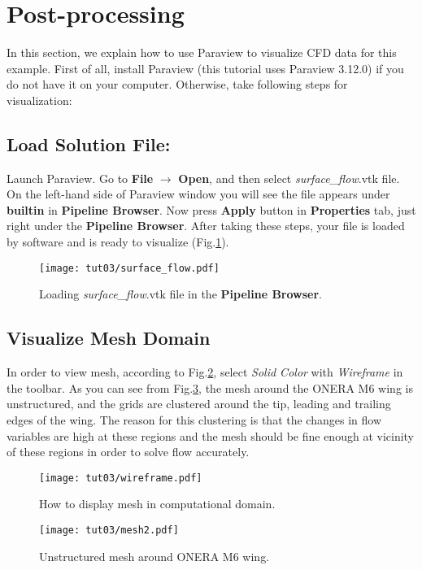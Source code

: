 \section{Post-processing}
In this section, we explain how to use Paraview to visualize CFD data for this example. First of all, install Paraview (this tutorial uses Paraview 3.12.0) if you do not have it on your computer. Otherwise, take following steps for visualization:
\subsection{Load Solution File:}
Launch Paraview. Go to \textbf{File} $\rightarrow$ \textbf{Open}, and then select \textit{surface\_flow}.vtk file. On the left-hand side of Paraview window you will see the file appears under \textbf{builtin} in \textbf{Pipeline Browser}. Now press \textbf{Apply} button in \textbf{Properties} tab, just right under the  \textbf{Pipeline Browser}. After taking these steps, your file is loaded by software and is ready to visualize (Fig.\ref{fig:load}).
\begin{figure}[htbp]
    \centering
    \texttt{[image: tut03/surface\_flow.pdf]}
    \caption{Loading \textit{surface\_flow}.vtk file in the \textbf{Pipeline Browser}.}
    \label{fig:load}
\end{figure}
\subsection{Visualize Mesh Domain}
In order to view mesh, according to Fig.\ref{fig:wireframe}, select \textit{Solid Color} with \textit{Wireframe} in the toolbar. As you can see from Fig.\ref{fig:mesh}, the mesh around the ONERA M6 wing is unstructured, and the grids are clustered around the tip, leading and trailing edges of the wing. The reason for this clustering is that the changes in flow variables are high at these regions and the mesh should be fine enough at vicinity of these regions in order to solve flow accurately.
\begin{figure}[htbp]
    \centering
    \texttt{[image: tut03/wireframe.pdf]}
    \caption{How to display mesh in computational domain.}
    \label{fig:wireframe}
\end{figure}
\begin{figure}[htbp]
    \centering
    \texttt{[image: tut03/mesh2.pdf]}
    \caption{Unstructured mesh around ONERA M6 wing.}
    \label{fig:mesh}
\end{figure}
